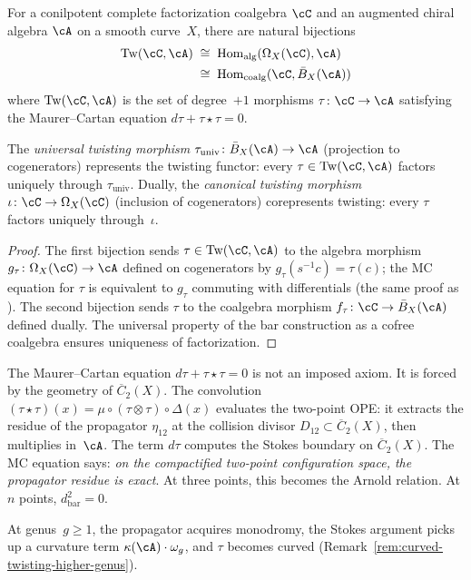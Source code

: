 \begin{corollary}
\label{cor:three-bijections}
For a conilpotent complete factorization coalgebra $\cC$
and an augmented chiral algebra $\cA$ on a smooth curve~$X$,
there are natural bijections
\begin{align}\label{eq:three-bijections}
\mathrm{Tw}(\cC, \cA)
&\;\cong\;
\operatorname{Hom}_{\mathrm{alg}}(\Omega_X(\cC), \cA)
\notag\\
&\;\cong\;
\operatorname{Hom}_{\mathrm{coalg}}(\cC, \bar{B}_X(\cA))
\end{align}
where\/ $\mathrm{Tw}(\cC, \cA)$ is the set of degree~$+1$
morphisms $\tau\colon \cC \to \cA$ satisfying the
Maurer--Cartan equation $d\tau + \tau \star \tau = 0$.

The \emph{universal twisting morphism}
$\tau_{\mathrm{univ}}\colon \bar{B}_X(\cA) \to \cA$
(projection to cogenerators) represents the twisting
functor: every $\tau \in \mathrm{Tw}(\cC, \cA)$
factors uniquely through $\tau_{\mathrm{univ}}$.
Dually, the \emph{canonical twisting morphism}
$\iota\colon \cC \to \Omega_X(\cC)$
(inclusion of cogenerators) corepresents
twisting: every $\tau$ factors uniquely through~$\iota$.
\end{corollary}

\begin{proof}
The first bijection sends $\tau \in \mathrm{Tw}(\cC, \cA)$
to the algebra morphism $g_\tau\colon \Omega_X(\cC) \to \cA$
defined on cogenerators by $g_\tau(s^{-1} c) = \tau(c)$; the
MC equation for $\tau$ is equivalent to $g_\tau$ commuting
with differentials
(the same proof as \cite[Theorem~2.2.7]{LV12}).
The second bijection sends $\tau$ to the coalgebra morphism
$f_\tau\colon \cC \to \bar{B}_X(\cA)$ defined dually.
The universal property of the bar construction as a cofree
coalgebra ensures uniqueness of factorization.
\end{proof}

\begin{remark}
\label{rem:MC-is-Stokes}
The Maurer--Cartan equation $d\tau + \tau \star \tau = 0$ is
not an imposed axiom.  It is forced by the geometry of
$\overline{C}_2(X)$.  The convolution
$(\tau \star \tau)(x) = \mu \circ (\tau \otimes \tau)
\circ \Delta(x)$ evaluates the two-point OPE: it extracts
the residue of the propagator $\eta_{12}$ at the collision
divisor $D_{12} \subset \overline{C}_2(X)$, then multiplies
in~$\cA$.  The term $d\tau$ computes the Stokes boundary
on $\overline{C}_2(X)$.  The MC equation says:
\emph{on the compactified two-point configuration space,
the propagator residue is exact}.
At three points, this becomes the Arnold relation.
At $n$ points, $d_{\mathrm{bar}}^2 = 0$.

At genus~$g \geq 1$, the propagator acquires monodromy, the
Stokes argument picks up a curvature term
$\kappa(\cA) \cdot \omega_g$, and $\tau$ becomes curved
(Remark~\ref{rem:curved-twisting-higher-genus}).
\end{remark}

